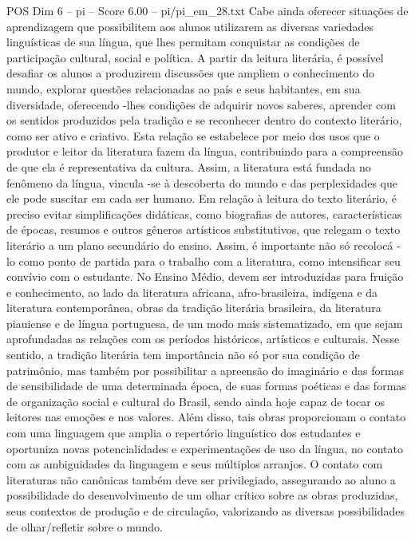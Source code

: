 \begin{textsample}{POS Dim 6 – pi – Score 6.00 – pi/pi\_em\_28.txt}
Cabe ainda oferecer situações de aprendizagem que possibilitem aos alunos utilizarem as diversas variedades linguísticas de sua língua, que lhes permitam conquistar as condições de participação cultural, social e política.
A partir da leitura literária, é possível desafiar os alunos a produzirem discussões que ampliem o conhecimento do mundo, explorar questões relacionadas ao país e seus habitantes, em sua diversidade, oferecendo -lhes condições de adquirir novos saberes, aprender com os sentidos produzidos pela tradição e se reconhecer dentro do contexto literário, como ser ativo e criativo.
Esta relação se estabelece por meio dos usos que o produtor e leitor da literatura fazem da língua, contribuindo para a compreensão de que ela é representativa da cultura.
Assim, a literatura está fundada no fenômeno da língua, vincula -se à descoberta do mundo e das perplexidades que ele pode suscitar em cada ser humano.
Em relação à leitura do texto literário, é preciso evitar simplificações didáticas, como biografias de autores, características de épocas, resumos e outros gêneros artísticos substitutivos, que relegam o texto literário a um plano secundário do ensino.
Assim, é importante não só recolocá -lo como ponto de partida para o trabalho com a literatura, como intensificar seu convívio com o estudante.
No Ensino Médio, devem ser introduzidas para fruição e conhecimento, ao lado da literatura africana, afro-brasileira, indígena e da literatura contemporânea, obras da tradição literária brasileira, da literatura piauiense e de língua portuguesa, de um modo mais sistematizado, em que sejam aprofundadas as relações com os períodos históricos, artísticos e culturais.
Nesse sentido, a tradição literária tem importância não só por sua condição de patrimônio, mas também por possibilitar a apreensão do imaginário e das formas de sensibilidade de uma determinada época, de suas formas poéticas e das formas de organização social e cultural do Brasil, sendo ainda hoje capaz de tocar os leitores nas emoções e nos valores.
Além disso, tais obras proporcionam o contato com uma linguagem que amplia o repertório linguístico dos estudantes e oportuniza novas potencialidades e experimentações de uso da língua, no contato com as ambiguidades da linguagem e seus múltiplos arranjos.
O contato com literaturas não canônicas também deve ser privilegiado, assegurando ao aluno a possibilidade do desenvolvimento de um olhar crítico sobre as obras produzidas, seus contextos de produção e de circulação, valorizando as diversas possibilidades de olhar/refletir sobre o mundo.

\end{textsample}
